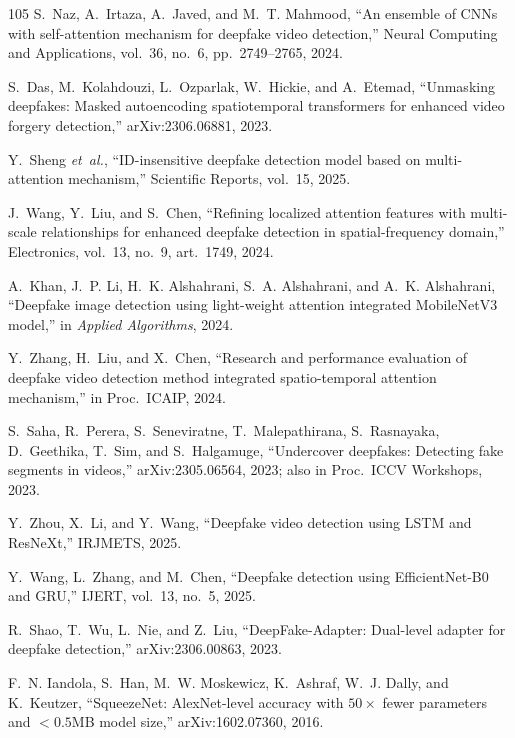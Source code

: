 \begin{thebibliography}{105}
S.~Naz, A.~Irtaza, A.~Javed, and M.~T. Mahmood, ``An ensemble of CNNs with self-attention mechanism for deepfake video detection,'' Neural Computing and Applications, vol.~36, no.~6, pp.~2749--2765, 2024.

S.~Das, M.~Kolahdouzi, L.~Ozparlak, W.~Hickie, and A.~Etemad, ``Unmasking deepfakes: Masked autoencoding spatiotemporal transformers for enhanced video forgery detection,'' arXiv:2306.06881, 2023.

Y.~Sheng \emph{et~al.}, ``ID-insensitive deepfake detection model based on multi-attention mechanism,'' Scientific Reports, vol.~15, 2025.

J.~Wang, Y.~Liu, and S.~Chen, ``Refining localized attention features with multi-scale relationships for enhanced deepfake detection in spatial-frequency domain,'' Electronics, vol.~13, no.~9, art.~1749, 2024.

A.~Khan, J.~P. Li, H.~K. Alshahrani, S.~A. Alshahrani, and A.~K. Alshahrani, ``Deepfake image detection using light-weight attention integrated MobileNetV3 model,'' in \emph{Applied Algorithms}, 2024.

Y.~Zhang, H.~Liu, and X.~Chen, ``Research and performance evaluation of deepfake video detection method integrated spatio-temporal attention mechanism,'' in Proc.\ ICAIP, 2024.

S.~Saha, R.~Perera, S.~Seneviratne, T.~Malepathirana, S.~Rasnayaka, D.~Geethika, T.~Sim, and S.~Halgamuge, ``Undercover deepfakes: Detecting fake segments in videos,'' arXiv:2305.06564, 2023; also in Proc.\ ICCV Workshops, 2023.

Y.~Zhou, X.~Li, and Y.~Wang, ``Deepfake video detection using LSTM and ResNeXt,'' IRJMETS, 2025.

Y.~Wang, L.~Zhang, and M.~Chen, ``Deepfake detection using EfficientNet-B0 and GRU,'' IJERT, vol.~13, no.~5, 2025.

R.~Shao, T.~Wu, L.~Nie, and Z.~Liu, ``DeepFake-Adapter: Dual-level adapter for deepfake detection,'' arXiv:2306.00863, 2023.

F.~N. Iandola, S.~Han, M.~W. Moskewicz, K.~Ashraf, W.~J. Dally, and K.~Keutzer, ``SqueezeNet: AlexNet-level accuracy with $50{\times}$ fewer parameters and $<0.5$MB model size,'' arXiv:1602.07360, 2016.


\end{thebibliography}
